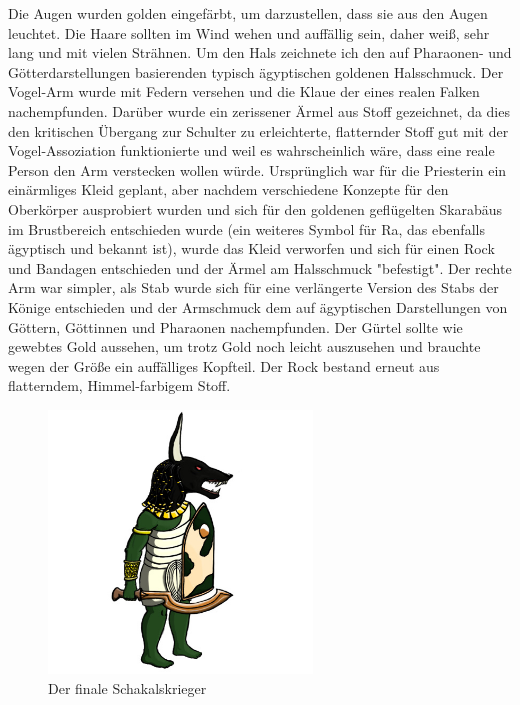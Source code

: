 \documentclass[extern,palatino]{cgBA}
\begin{document}
Die Augen wurden golden eingefärbt, um darzustellen, dass sie aus den Augen leuchtet. Die Haare sollten im Wind wehen und auffällig sein, daher weiß, sehr lang und mit vielen Strähnen. Um den Hals zeichnete ich den auf Pharaonen- und Götterdarstellungen basierenden typisch ägyptischen goldenen Halsschmuck. Der Vogel-Arm wurde mit Federn versehen und die Klaue der eines realen Falken nachempfunden. Darüber wurde ein zerissener Ärmel aus Stoff gezeichnet, da dies den kritischen Übergang zur Schulter zu erleichterte, flatternder Stoff gut mit der Vogel-Assoziation funktionierte und weil es wahrscheinlich wäre, dass eine reale Person den Arm verstecken wollen würde. Ursprünglich war für die Priesterin ein einärmliges Kleid geplant, aber nachdem verschiedene Konzepte für den Oberkörper ausprobiert wurden und sich für den goldenen geflügelten Skarabäus im Brustbereich entschieden wurde (ein weiteres Symbol für Ra, das ebenfalls ägyptisch und bekannt ist), wurde das Kleid verworfen und sich für einen Rock und Bandagen entschieden und der Ärmel am Halsschmuck "befestigt". Der rechte Arm war simpler, als Stab wurde sich für eine verlängerte Version des Stabs der Könige entschieden und der Armschmuck dem auf ägyptischen Darstellungen von Göttern, Göttinnen und Pharaonen nachempfunden. Der Gürtel sollte wie gewebtes Gold aussehen, um trotz Gold noch leicht auszusehen und brauchte wegen der Größe ein auffälliges Kopfteil. Der Rock bestand erneut aus flatterndem, Himmel-farbigem Stoff.
	
\newpage
\begin{figure}[H]
	\centering
	\includegraphics[height=7cm]{jackal.jpg}
	\caption{Der finale Schakalskrieger}
	\label{jackal}
\end{figure}
\end{document}
